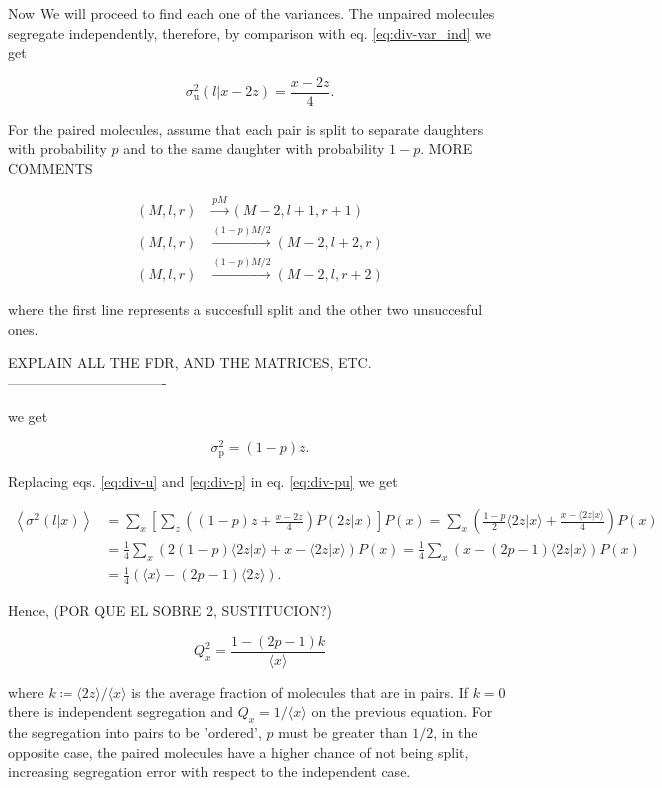 Now We will proceed to find each one of the variances. The unpaired molecules segregate independently, therefore, by comparison with eq. \eqref{eq:div-var_ind} we get

\begin{equation}
  \label{eq:div-u}
  \sigma^2_\text{u}(l|x-2z) = \frac{x-2z}{4}.
\end{equation}

For the paired molecules, assume that each pair is split to separate daughters with probability $p$ and to the same daughter with probability $1-p$. MORE COMMENTS

\begin{equation}
  \begin{split}
    (M,l,r)&\xrightarrow{pM}(M-2,l+1,r+1)\\
    (M,l,r)&\xrightarrow{(1-p)M/2}(M-2,l+2,r)\\
    (M,l,r)&\xrightarrow{(1-p)M/2}(M-2,l,r+2)
  \end{split}
\end{equation}

where the first line represents a succesfull split and the other two unsuccesful ones.

EXPLAIN ALL THE FDR, AND THE MATRICES, ETC.
----------------------------------

we get

\begin{equation}
  \label{eq:div-p}
  \sigma^2_\text{p}=(1-p)z.
\end{equation}

Replacing eqs. \eqref{eq:div-u} and \eqref{eq:div-p} in eq. \eqref{eq:div-pu} we get

\begin{equation}
  \begin{split}
    \left\langle\sigma^2(l|x)\right\rangle &=\sum_{x}\left[\sum_z\left((1-p)z+\frac{x-2z}{4}\right)P(2z|x)\right]P(x) = \sum_x\left(\frac{1-p}{2}\langle 2z|x\rangle+\frac{x-\langle 2z|x\rangle}{4}\right)P(x)\\
    &=\frac{1}{4}\sum_x\left(2(1-p)\langle 2z|x\rangle+x-\langle 2z|x\rangle\right)P(x) = \frac{1}{4}\sum_x\left(x-(2p-1)\langle 2z|x\rangle\right)P(x)\\
    &=\frac{1}{4}\left(\langle x\rangle - (2p-1)\langle 2z\rangle\right).
  \end{split}
\end{equation}

Hence, (POR QUE EL SOBRE 2, SUSTITUCION?)

\begin{equation}
  \boxed{Q_x^2 = \frac{1 - (2p-1)k}{\langle x\rangle}}
\end{equation}

where $k\coloneqq\langle 2z\rangle/\langle x\rangle$ is the average fraction of molecules that are in pairs. If $k=0$ there is independent segregation and $Q_x = 1/\langle x\rangle$ on the previous equation. For the segregation into pairs to be 'ordered', $p$ must be greater than $1/2$, in the opposite case, the paired molecules have a higher chance of not being split, increasing segregation error with respect to the independent case.
